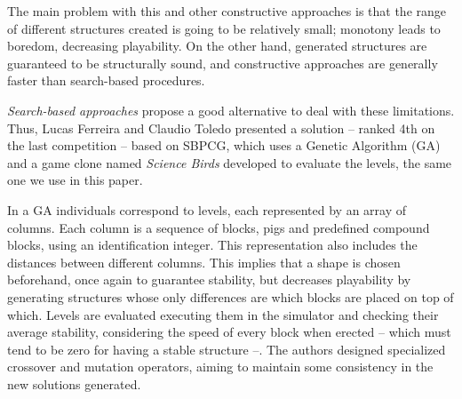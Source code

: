 \documentclass[runningheads,a4paper]{llncs}
\begin{document}
The main problem with this and other constructive approaches is that the range of
different structures created is going to be relatively small; monotony
leads to boredom, decreasing playability. On the other hand, generated
structures are guaranteed to be structurally sound, and constructive
approaches are generally faster than search-based procedures.

\textit{Search-based approaches} propose a good alternative to deal
with these limitations. Thus, Lucas Ferreira and Claudio Toledo
 \cite{ferreira2014search} presented a solution -- ranked 4th on the
last competition -- based on SBPCG, which uses a Genetic Algorithm
(GA) and a game clone named \textit{Science Birds} developed to
evaluate the levels, the same one we use in this paper.

In a GA individuals correspond to levels, each represented by an array
of columns. Each column is a sequence of blocks, pigs and predefined
compound blocks, using an identification integer. This representation
also includes the distances between different columns.
This implies that a shape is chosen beforehand, once
again to guarantee stability, but decreases playability by generating
structures whose only differences are which blocks are placed on top
of which.  Levels are evaluated executing them in the simulator and
checking their average stability, considering the speed of every block
when erected -- which must tend to be zero for having a stable
structure --. The authors designed specialized crossover and mutation
operators, aiming to maintain some consistency in the new solutions
generated.
\end{document}
